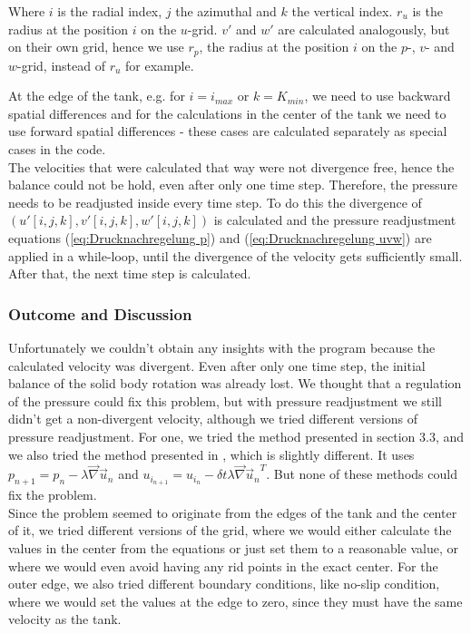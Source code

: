 \documentclass[12pt, a4paper]{article} %
\begin{document}
			Where $i$ is the radial index, $j$ the azimuthal and $k$ the vertical index. $r_u$ is the radius at the position $i$ on the $u$-grid. $v'$ and $w'$ are calculated analogously, but on their own grid, hence we use $r_p$, the radius at the position $i$ on the $p$-, $v$- and $w$-grid, instead of $r_u$ for example.
			
			At the edge of the tank, e.g. for $i=i_{max}$ or $k=K_{min}$, we need to use backward spatial differences and for the calculations in the center of the tank we need to use forward spatial differences - these cases are calculated separately as special cases in the code.\\
			
			The velocities that were calculated that way were not divergence free, hence the balance could not be hold, even after only one time step. Therefore, the pressure needs to be readjusted inside every time step. To do this the divergence of $\left(u'[i,j,k], v'[i,j,k], w'[i,j,k]\right)$ is calculated and the pressure readjustment equations (\ref{eq:Drucknachregelung p}) and (\ref{eq:Drucknachregelung uvw}) are applied in a while-loop, until the divergence of the velocity gets sufficiently small.
			After that, the next time step is calculated.
			
		\subsubsection{Outcome and Discussion}
			Unfortunately we couldn't obtain any insights with the program because the calculated velocity was divergent. Even after only one time step, the initial balance of the solid body rotation was already lost. We thought that a regulation of the pressure  could fix this problem, but with pressure readjustment we still  didn't get a non-divergent velocity, although we tried different versions of pressure readjustment. 
			For one, we tried the method presented in section 3.3, and we also tried the method presented in \cite{Schmittfull2005}
			, which is slightly different. It uses $p_{n+1} = p_n - \lambda \vec{\nabla} \vec{u}_n$ and $u_{i_{n+1}} = u_{i_{n}} - \delta t \lambda \vec{\nabla}{\vec{u}_n}^T$. But none of these methods could fix the problem.\\
			
			Since the problem seemed to originate from the edges of the tank and the center of it, we tried different versions of the grid, where we would either calculate the values in the center from the equations or just set them to a reasonable value, or where we would even avoid having any rid points in the exact center. For the outer edge, we also tried different boundary conditions, like no-slip condition, where we would set the values at the edge to zero, since they must have the same velocity as the tank.
			
\end{document}
